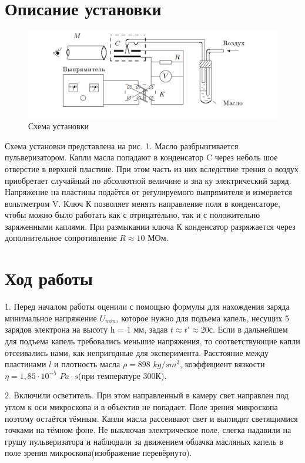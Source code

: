 \documentclass[a4paper,12pt]{article}
\begin{document}
\section*{Описание установки}
\begin{figure}[h]
    \centering
    \includegraphics[scale=0.6]{1.png}
    \caption{Схема установки}
    \label{fig:your_label}
\end{figure}
Схема установки представлена на рис. 1. Масло разбрызгивается пульверизатором. Капли масла попадают в конденсатор C через неболь шое отверстие в верхней пластине. При этом часть из них вследствие трения о воздух приобретает случайный по абсолютной величине и зна ку электрический заряд. Напряжение на пластины подаётся от регулируемого выпрямителя и измеряется вольтметром V. Ключ К позволяет менять направление поля в конденсаторе, чтобы можно было работать как с отрицательно, так и с положительно заряженными каплями. При размыкании ключа К конденсатор разряжается через дополнительное сопротивление $R\approx10$ МОм.
\section*{Ход работы}

\par 1. Перед началом работы оценили с помощью формулы для нахождения заряда минимальное напряжение $U_{min}$, которое нужно для подъема капель, несущих 5 зарядов электрона на высоту h = 1 мм, задав $t \approx t' \approx 20 с$. Если в дальнейшем для подъема капель требовались меньшие напряжения, то соответствующие капли отсеивались нами, как непригодные для эксперимента. Расстояние между пластинами $l$ и плотность масла $\rho = 898$ $kg/sm^{3}$, коэффициент вязкости $\eta = 1,85\cdot10^{-5}$ $Pa\cdot s$(при температуре 300К).
\par 
	2. Включили осветитель. При этом направленный в камеру свет направлен под углом к оси микроскопа и в объектив не попадает. Поле зрения микроскопа поэтому остаётся тёмным. Капли масла рассеивают свет и выглядят светящимися точками на тёмном фоне. Не выключая электрическое поле, слегка надавили на грушу пульверизатора и наблюдали за движением облачка масляных капель в поле зрения микроскопа(изображение перевёрнуто).
	
\end{document}
